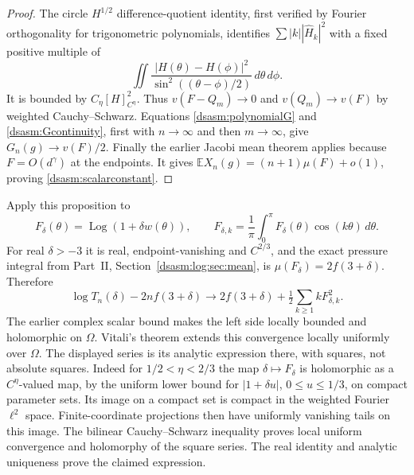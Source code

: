 \documentclass[11pt,letterpaper]{article}
\theoremstyle{remark}\newtheorem{remark}[theorem]{Remark}
\DeclareMathOperator{\Log}{Log}\DeclareMathOperator{\Var}{Var}
\begin{document}
\begin{proof}
The circle $H^{1/2}$ difference-quotient identity, first verified by
Fourier orthogonality for trigonometric polynomials, identifies
$\sum |k||\widehat H_k|^2$ with a fixed positive multiple of
\[
 \iint\frac{|H(\theta)-H(\phi)|^2}
                   {\sin^2((\theta-\phi)/2)}\,d\theta\,d\phi.
\]
It is bounded by $C_\eta[H]_{C^\eta}^2$. Thus $v(F-Q_m)\to0$ and
$v(Q_m)\to v(F)$ by weighted Cauchy--Schwarz. Equations
\eqref{dsasm:polynomialG} and \eqref{dsasm:Gcontinuity}, first with $n\to\infty$
and then $m\to\infty$, give $G_n(g)\to v(F)/2$.
Finally the earlier Jacobi mean theorem applies because
$F=O(d^\gamma)$ at the endpoints. It gives
$\mathbb EX_n(g)=(n+1)\mu(F)+o(1)$, proving
\eqref{dsasm:scalarconstant}.
\end{proof}

Apply this proposition to
\[
 F_\delta(\theta)=\Log(1+\delta w(\theta)),\qquad
 F_{\delta,k}=\frac1\pi\int_0^\pi F_\delta(\theta)\cos(k\theta)\,d\theta.
\]
For real $\delta>-3$ it is real, endpoint-vanishing and $C^{2/3}$,
and the exact pressure integral from Part~II, Section~\ref{dsasm:log:sec:mean}, is
$\mu(F_\delta)=2f(3+\delta)$. Therefore
\begin{equation}\label{dsasm:scalarreallimit}
 \log T_n(\delta)-2nf(3+\delta)
 \longrightarrow 2f(3+\delta)+\tfrac12\sum_{k\ge1}kF_{\delta,k}^2.
\end{equation}
The earlier complex scalar bound makes the left side locally bounded
and holomorphic on $\Omega$. Vitali's theorem extends this convergence
locally uniformly over $\Omega$. The displayed series is its analytic
expression there, with squares, not absolute squares. Indeed for
$1/2<\eta<2/3$ the map $\delta\mapsto F_\delta$ is holomorphic
as a $C^\eta$-valued map, by the uniform lower bound for
$|1+\delta u|$, $0\le u\le1/3$, on compact parameter sets.
Its image on a compact set is compact in the weighted Fourier
$\ell^2$ space. Finite-coordinate projections then have uniformly
vanishing tails on this image. The bilinear Cauchy--Schwarz inequality
proves local uniform convergence and holomorphy of the square series.
The real identity and analytic uniqueness prove the claimed expression.
\end{document}
